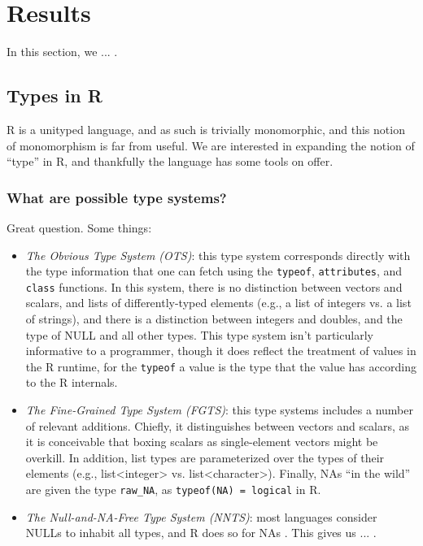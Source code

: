 \documentclass[acmsmall,10pt,review,anonymous]{acmart}\settopmatter{printfolios=true,printccs=false,printacmref=false}
\begin{document}
%
%
%
%
%
%
\section{Results}

In this section, we ... .

%
%
%
%
\subsection{Types in R}


R is a unityped language, and as such is trivially monomorphic, and this notion of monomorphism is far from useful.
We are interested in expanding the notion of ``type'' in R, and thankfully the language has some tools on offer.

%
%
\subsubsection{What are possible type systems?}

Great question.
Some things:

\begin{itemize}

\item {\it The Obvious Type System (OTS)}: this type system corresponds directly with the type information that one can fetch using the {\tt typeof}, {\tt attributes}, and {\tt class} functions.
In this system, there is no distinction between vectors and scalars, and lists of differently-typed elements (e.g., a list of integers vs. a list of strings), and there is a distinction between integers and doubles, and the type of NULL and all other types.
This type system isn't particularly informative to a programmer, though it does reflect the treatment of values in the R runtime, for the {\tt typeof} a value is the type that the value has according to the R internals.

\item {\it The Fine-Grained Type System (FGTS)}: this type systems includes a number of relevant additions.
Chiefly, it distinguishes between vectors and scalars, as it is conceivable that boxing scalars as single-element vectors might be overkill.
In addition, list types are parameterized over the types of their elements (e.g., list<integer> vs. list<character>).
Finally, NAs ``in the wild'' are given the type {\tt raw\_NA}, as {\tt typeof(NA) = logical} in R.

\item {\it The Null-and-NA-Free Type System (NNTS)}: most languages consider NULLs to inhabit all types, and R does so for NAs .
This gives us ... .

\end{itemize}
\end{document}
